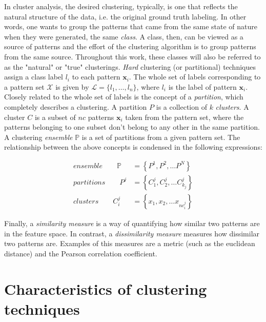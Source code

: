 In cluster analysis, the desired clustering, typically, is one that reflects the natural structure of the data, i.e. the original ground truth labeling.
In other words, one wants to group the patterns that came from the same state of nature when they were generated, the same \emph{class}.
A class, then, can be viewed as a source of patterns and the effort of the clustering algorithm is to group patterns from the same source.
Throughout this work, these classes will also be referred to as the "natural" or "true" clusterings.
\emph{Hard} clustering (or partitional) techniques assign a class label $l_i$ to each pattern $\mathbf{x}_i$.
The whole set of labels corresponding to a pattern set $\mathcal{X}$ is given by $\mathcal{L} = \{ l_1, \ldots, l_n \}$, where $l_i$ is the label of pattern $\mathbf{x}_i$.
Closely related to the whole set of labels is the concept of a \emph{partition}, which completely describes a clustering.
A partition $P$ is a collection of $k$ \emph{clusters}.
A cluster $C$ is a subset of $nc$ patterns $\mathbf{x}_i$ taken from the pattern set, where the patterns belonging to one subset don't belong to any other in the same partition.
A clustering \emph{ensemble} $\mathbb{P}$ is a set of partitions from a given pattern set.
The relationship between the above concepts is condensed in the following expressions:

\begin{align}
    ensemble \qquad \mathbb{P} &= \left \{   P^1, P^2, \ldots P^N   \right \}  \label{eq:ensemble} \\
    partitions \qquad P^j &= \left \{   C^j_1, C^j_2, \ldots C^{j}_{k_j}   \right \}  \label{eq:partition} \\
    clusters \qquad C^j_i &= \left \{   x_1, x_2, \ldots x_{nc^j_i}   \right \} \label{eq:cluster}
\end{align}


Finally, a \emph{similarity measure} is a way of quantifying how similar two patterns are in the feature space. In contrast, a \emph{dissimilarity measure} measures how dissimilar two patterns are.  Examples of this measures are a metric (such as the euclidean distance) and the Pearson correlation coefficient.%

\section{Characteristics of clustering techniques}
\label{sec:clustering properties}

